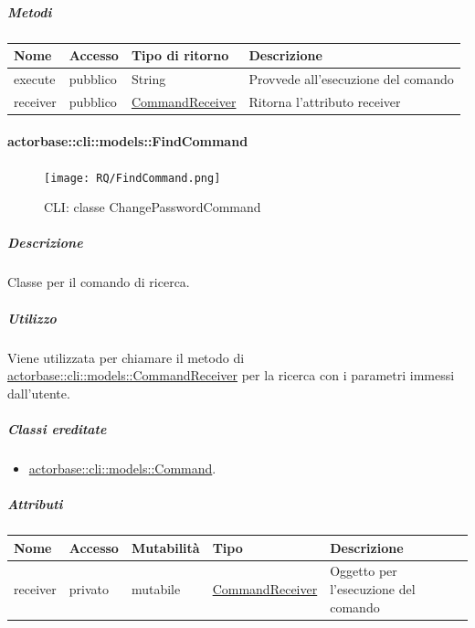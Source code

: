 \documentclass{scalatekids-article}
\begin{document}
\subparagraph{Metodi}

\begin{tabular}{| p{3cm} | p{1.5cm} | p{3.5cm} | p{9cm} |}
  \hline
  Nome & Accesso & Tipo di ritorno & Descrizione\\
  \hline
  execute & pubblico & String & Provvede all'esecuzione del comando\\
  \hline
  receiver & pubblico & \hyperref[sec:actorbase::cli::models::CommandReceiver]{CommandReceiver} & Ritorna l'attributo receiver\\
  \hline
\end{tabular}


\paragraph{actorbase::cli::models::FindCommand}
\label{sec:actorbase::cli::models::FindCommand}

\begin{figure}[H]
  \begin{center}
    \texttt{[image: RQ/FindCommand.png]}
    \caption{CLI: classe ChangePasswordCommand}
  \end{center}
\end{figure}

\subparagraph{Descrizione}

Classe per il comando di ricerca.

\subparagraph{Utilizzo}

Viene utilizzata per chiamare il metodo di
\hyperref[sec:actorbase::cli::models::CommandReceiver]{actorbase::cli::models::CommandReceiver} per la ricerca con i parametri immessi
dall'utente.

\subparagraph{Classi ereditate}

\begin{itemize}
\item \hyperref[sec:actorbase::cli::models::Command]{actorbase::cli::models::Command}.
\end{itemize}

\subparagraph{Attributi}

\begin{tabular}{| p{1cm} | p{1.5cm} | p{2cm} | p{4cm} | p{8.5cm} |}
  \hline
  Nome & Accesso & Mutabilità & Tipo & Descrizione\\
  \hline
  receiver & privato & mutabile & \hyperref[sec:actorbase::cli::models::CommandReceiver]{CommandReceiver} & Oggetto per l'esecuzione del comando \\
  \hline
\end{tabular}
\end{document}
